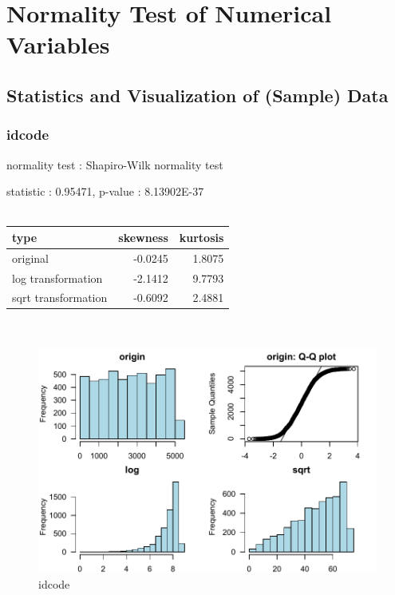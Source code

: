 \documentclass{book}\usepackage[]{graphicx}\usepackage[]{color}
\begin{document}
\clearpage

\section{Normality Test of Numerical Variables}
\subsection{Statistics and Visualization of (Sample) Data}

\subsubsection{ idcode }

normality test : Shapiro-Wilk normality test

\noindent statistic : 0.95471,  p-value : 8.13902E-37\\
\\%
\begin{tabular}{lrr}
  \toprule
type & skewness & kurtosis \\ 
  \midrule
original & -0.0245 & 1.8075 \\ 
  log transformation & -2.1412 & 9.7793 \\ 
  sqrt transformation & -0.6092 & 2.4881 \\ 
   \bottomrule
\end{tabular}
\\
\begin{figure}[!ht]
\centering
\includegraphics[width=1.0\textwidth]{figure/norm1.pdf}
\caption{idcode}
\end{figure}
\clearpage
\end{document}
